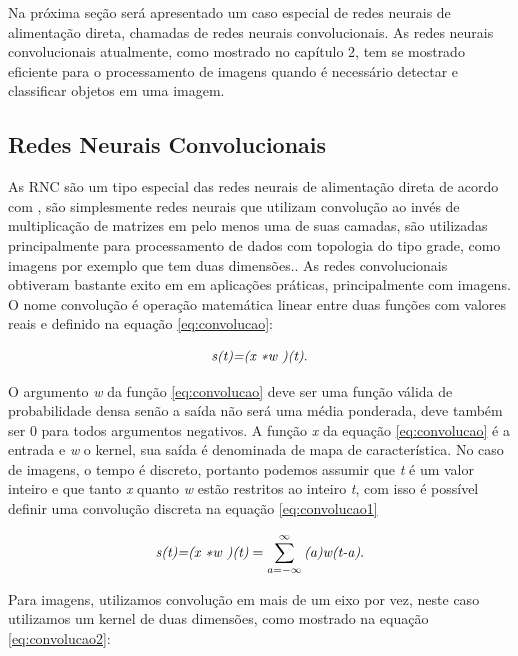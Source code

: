 \documentclass[
	12pt,				%
    oneside,			%
	a4paper,			%
	english,			%
	french,				%
	spanish,			%
	brazil,				%
	]{abntex2}
\begin{document}
Na próxima seção será apresentado um caso especial de redes neurais de alimentação direta, chamadas de redes neurais convolucionais. As redes neurais convolucionais atualmente, como mostrado no capítulo 2, tem se mostrado eficiente para o processamento de imagens quando é necessário detectar e classificar objetos em uma imagem.


\subsection{Redes Neurais Convolucionais}
As RNC são um tipo especial das redes neurais de alimentação direta de acordo com  , são simplesmente redes neurais que utilizam convolução ao invés de multiplicação de matrizes em pelo menos uma de suas camadas, são utilizadas principalmente para processamento de dados com topologia do tipo grade, como imagens por exemplo que tem duas dimensões.. As redes convolucionais obtiveram bastante exito em em aplicações práticas, principalmente com imagens. 
O nome convolução é operação matemática linear entre duas funções com valores reais e definido na equação \ref{eq:convolucao}:

\begin{equation}
\centering
    \textit{s(t)=(x \textasteriskcentered w )(t)}.
    \label{eq:convolucao}
\end{equation}

O argumento \textit{w} da função \ref{eq:convolucao} deve ser uma função válida de probabilidade densa senão a saída não será uma média ponderada, deve também ser 0 para todos argumentos negativos. A função \textit{x} da equação \ref{eq:convolucao} é a entrada e \textit{w} o kernel, sua saída é denominada de mapa de característica. No caso de imagens, o tempo é discreto, portanto podemos assumir que \textit{t} é um valor inteiro e que tanto \textit{x} quanto \textit{w} estão restritos ao inteiro \textit{t}, com isso é possível definir uma convolução discreta na equação \ref{eq:convolucao1}

\begin{equation}
\centering
    \textit{s(t)=(x \textasteriskcentered w )(t)} = \sum_{a=- \infty}^{\infty} \textit{(a)w(t-a)} .
    \label{eq:convolucao1}
\end{equation}

Para imagens, utilizamos convolução em mais de um eixo por vez, neste caso utilizamos um kernel de duas dimensões, como mostrado na equação \ref{eq:convolucao2}:
\end{document}
